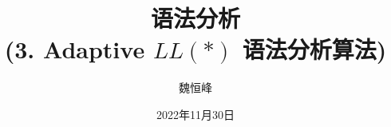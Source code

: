 \documentclass[]{beamer}
\title[语法分析]{语法分析 \\ (3. Adaptive $LL(\ast)$ 语法分析算法)}
\author[魏恒峰]{\large 魏恒峰}
\institute{hfwei@nju.edu.cn}
\date{2022年11月30日}
\begin{document}
\maketitle





\thankyou{}

\end{document}
